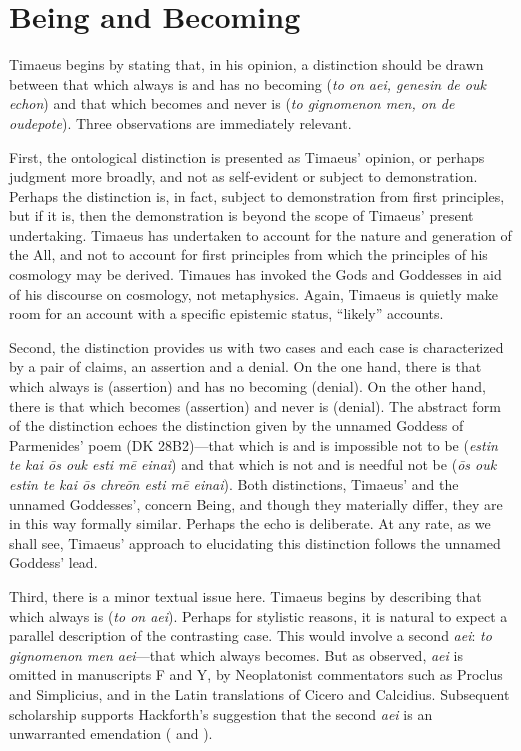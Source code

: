 
\section{Being and Becoming} %
\label{sec:Being and Becoming}

Timaeus begins by stating that, in his opinion, a distinction should be drawn between that which always is and has no becoming (\emph{to on aei, genesin de ouk echon}) and that which becomes and never is (\emph{to gignomenon men, on de oudepote}). Three observations are immediately relevant. 

First, the ontological distinction is presented as Timaeus' opinion, or perhaps judgment more broadly, and not as self-evident or subject to demonstration. Perhaps the distinction is, in fact, subject to demonstration from first principles, but if it is, then the demonstration is beyond the scope of Timaeus' present undertaking. Timaeus has undertaken to account for the nature and generation of the All, and not to account for first principles from which the principles of his cosmology may be derived. Timaues has invoked the Gods and Goddesses in aid of his discourse on cosmology, not metaphysics. Again, Timaeus is quietly make room for an account with a specific epistemic status, ``likely'' accounts.

Second, the distinction provides us with two cases and each case is characterized by a pair of claims, an assertion and a denial. On the one hand, there is that which always is (assertion) and has no becoming (denial). On the other hand, there is that which becomes (assertion) and never is (denial). The abstract form of the distinction echoes the distinction given by the unnamed Goddess of Parmenides' poem (DK 28B2)---that which is and is impossible not to be (\emph{estin te kai ōs ouk esti mē einai}) and that which is not and is needful not be (\emph{ōs ouk estin te kai ōs chreōn esti mē einai}). Both distinctions, Timaeus' and the unnamed Goddesses', concern Being, and though they materially differ, they are in this way formally similar. Perhaps the echo is deliberate. At any rate, as we shall see, Timaeus' approach to elucidating this distinction follows the unnamed Goddess' lead.

Third, there is a minor textual issue here. Timaeus begins by describing that which always is (\emph{to on aei}). Perhaps for stylistic reasons, it is natural to expect a parallel description of the contrasting case. This would involve a second \emph{aei}: \emph{to gignomenon men aei}---that which always becomes. But as \citet{Hackforth:1959dj} observed, \emph{aei} is omitted in manuscripts F and Y, by Neoplatonist commentators such as Proclus and Simplicius, and in the Latin translations of Cicero and Calcidius. Subsequent scholarship supports Hackforth's suggestion that the second \emph{aei} is an unwarranted emendation (\citealt{Whittaker:1969mq,Whittaker:1973nz} and \citealt{Dillon:1989hc}). 

